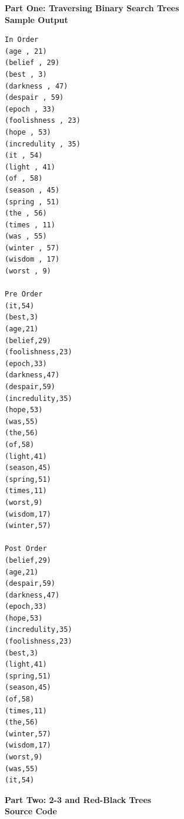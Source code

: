 \documentclass{article}
\begin{document}
\begin{center}
\textbf{Part One: Traversing Binary Search Trees \\Sample Output}
\end{center}
\begin{lstlisting}
In Order
(age , 21)
(belief , 29)
(best , 3)
(darkness , 47)
(despair , 59)
(epoch , 33)
(foolishness , 23)
(hope , 53)
(incredulity , 35)
(it , 54)
(light , 41)
(of , 58)
(season , 45)
(spring , 51)
(the , 56)
(times , 11)
(was , 55)
(winter , 57)
(wisdom , 17)
(worst , 9)

Pre Order
(it,54)
(best,3)
(age,21)
(belief,29)
(foolishness,23)
(epoch,33)
(darkness,47)
(despair,59)
(incredulity,35)
(hope,53)
(was,55)
(the,56)
(of,58)
(light,41)
(season,45)
(spring,51)
(times,11)
(worst,9)
(wisdom,17)
(winter,57)

Post Order
(belief,29)
(age,21)
(despair,59)
(darkness,47)
(epoch,33)
(hope,53)
(incredulity,35)
(foolishness,23)
(best,3)
(light,41)
(spring,51)
(season,45)
(of,58)
(times,11)
(the,56)
(winter,57)
(wisdom,17)
(worst,9)
(was,55)
(it,54)
\end{lstlisting}
\newpage
\begin{center}
\textbf{Part Two: 2-3 and Red-Black Trees \\ Source Code}
\end{center}
\end{document}
